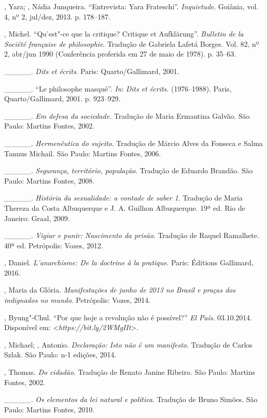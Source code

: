 \begin{Parskip}
, Yara; , Nádia Junqueira. ``Entrevista: Yara
Frateschi''. \emph{Inquietude}. Goiânia, vol. 4, nº 2, jul/dez, 2013.
p. 178--187.

, Michel. ``Qu'est"-ce que la critique? Critique et
Aufklärung''. \emph{Bulletin de la Société française de philosophie}.
Tradução de Gabriela Lafetá Borges. Vol.
82, nº 2, abr/jun 1990 (Conferência proferida em 27 de
maio de 1978). p. 35--63.

\_\_\_\_\_. \emph{Dits et écrits}. Paris: Quarto/Gallimard, 2001.

\_\_\_\_\_. ``Le philosophe masqué''. \emph{In}: \emph{Dits et
écrits. } (1976--1988). Paris, Quarto/Gallimard, 2001. p. 923--929.

\_\_\_\_\_. \emph{Em defesa da sociedade.} Tradução de Maria
Ermantina Galvão. São Paulo: Martins Fontes, 2002.

\_\_\_\_\_. \emph{Hermenêutica do sujeito}. Tradução de Márcio
Alves da Fonseca e Salma Tannus Michail. São Paulo: Martins Fontes, 2006.

\_\_\_\_\_. \emph{Segurança, território, população}. Tradução de
Eduardo Brandão. São Paulo: Martins Fontes, 2008.

\_\_\_\_\_. \emph{História da sexualidade: a vontade de saber 1}.
Tradução de Maria Thereza da Costa Albuquerque e J. A. Guilhon
Albuquerque. 19ª ed. Rio de Janeiro: Graal, 2009.

\_\_\_\_\_. \emph{Vigiar e punir: Nascimento da prisão}. Tradução
de Raquel Ramalhete. 40ª ed. Petrópolis: Vozes, 2012.

, Daniel. \emph{L'anarchisme: De la doctrine à la
pratique}. Paris: Éditions Gallimard, 2016.

, Maria da Glória. \emph{Manifestações de junho de 2013 no
Brasil e praças dos indignados no mundo}. Petrópolis: Vozes, 2014.

, Byung"-Chul. ``Por que hoje a revolução não é possível?''
\emph{El País}. 03.10.2014. Disponível em:
\textless{}\emph{https://bit.ly/2WMgIIt}\textgreater{}.

, Michael; , Antonio. \emph{Declaração: Isto não é um
manifesto}. Tradução de Carlos Szlak. São Paulo: n-1 edições, 2014.

, Thomas. \emph{Do cidadão}. Tradução de Renato Janine
Ribeiro. São Paulo: Martins Fontes, 2002.

\_\_\_\_\_. \emph{Os elementos da lei natural e política}.
Tradução de Bruno Simões. São Paulo: Martins Fontes, 2010.


\end{Parskip}
